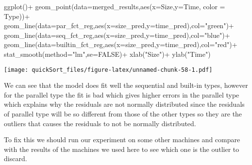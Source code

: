 \documentclass[
]{article}
\newenvironment{Shaded}{\begin{snugshade}}{\end{snugshade}}
\newcommand{\AttributeTok}[1]{\textcolor[rgb]{0.77,0.63,0.00}{#1}}
\newcommand{\ConstantTok}[1]{\textcolor[rgb]{0.00,0.00,0.00}{#1}}
\newcommand{\FunctionTok}[1]{\textcolor[rgb]{0.00,0.00,0.00}{#1}}
\newcommand{\NormalTok}[1]{#1}
\newcommand{\SpecialCharTok}[1]{\textcolor[rgb]{0.00,0.00,0.00}{#1}}
\newcommand{\StringTok}[1]{\textcolor[rgb]{0.31,0.60,0.02}{#1}}
\begin{document}
\begin{Shaded}
\begin{Highlighting}[]
\FunctionTok{ggplot}\NormalTok{()}\SpecialCharTok{+}
\FunctionTok{geom\_point}\NormalTok{(}\AttributeTok{data=}\NormalTok{merged\_results,}\FunctionTok{aes}\NormalTok{(}\AttributeTok{x=}\NormalTok{Size,}\AttributeTok{y=}\NormalTok{Time, }\AttributeTok{color =}\NormalTok{ Type))}\SpecialCharTok{+} \FunctionTok{geom\_line}\NormalTok{(}\AttributeTok{data=}\NormalTok{par\_fct\_reg,}\FunctionTok{aes}\NormalTok{(}\AttributeTok{x=}\NormalTok{size\_pred,}\AttributeTok{y=}\NormalTok{time\_pred),}\AttributeTok{col=}\StringTok{"green"}\NormalTok{)}\SpecialCharTok{+}
\FunctionTok{geom\_line}\NormalTok{(}\AttributeTok{data=}\NormalTok{seq\_fct\_reg,}\FunctionTok{aes}\NormalTok{(}\AttributeTok{x=}\NormalTok{size\_pred,}\AttributeTok{y=}\NormalTok{time\_pred),}\AttributeTok{col=}\StringTok{"blue"}\NormalTok{)}\SpecialCharTok{+}
\FunctionTok{geom\_line}\NormalTok{(}\AttributeTok{data=}\NormalTok{builtin\_fct\_reg,}\FunctionTok{aes}\NormalTok{(}\AttributeTok{x=}\NormalTok{size\_pred,}\AttributeTok{y=}\NormalTok{time\_pred),}\AttributeTok{col=}\StringTok{"red"}\NormalTok{)}\SpecialCharTok{+}
\FunctionTok{stat\_smooth}\NormalTok{(}\AttributeTok{method=}\StringTok{"lm"}\NormalTok{,}\AttributeTok{se=}\ConstantTok{FALSE}\NormalTok{)}\SpecialCharTok{+}
\FunctionTok{xlab}\NormalTok{(}\StringTok{"Size"}\NormalTok{)}\SpecialCharTok{+}
\FunctionTok{ylab}\NormalTok{(}\StringTok{"Time"}\NormalTok{)}
\end{Highlighting}
\end{Shaded}

\texttt{[image: quickSort\_files/figure-latex/unnamed-chunk-58-1.pdf]}

We can see that the model does fit well the sequential and built-in
types, however for the parallel type the fit is bad which gives higher
errors in the parallel type which explains why the residuals are not
normally distributed since the residuals of parallel type will be so
different from those of the other types so they are the outliers that
causes the residuals to not be normally distributed.

To fix this we should run our experiment on some other machines and
compare with the results of the machines we used here to see which one
is the outlier to discard.
\end{document}
